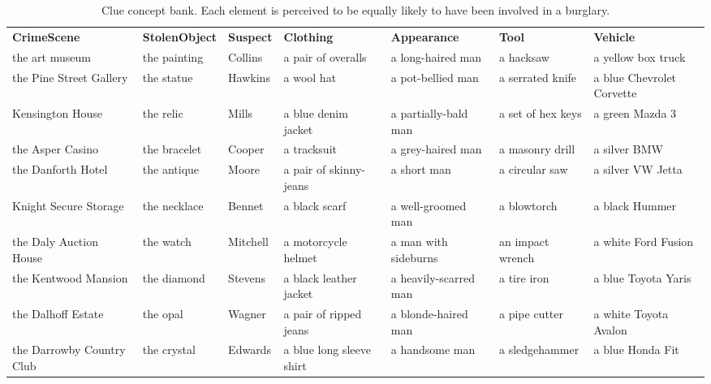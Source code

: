 \documentclass{article}
\begin{document}
\begin{landscape}

\begin{table}[]
\caption {Clue concept bank. Each element is perceived to be equally likely to have been involved in a burglary.} \label{tab:elements} 
\begin{tabular}{lllllll}
\textbf{CrimeScene}       & \textbf{StolenObject} & \textbf{Suspect} & \textbf{Clothing}        & \textbf{Appearance}   & \textbf{Tool}     & \textbf{Vehicle}          \\
the art museum            & the painting          & Collins          & a pair of overalls       & a long-haired man     & a hacksaw         & a yellow box truck        \\
the Pine Street Gallery   & the statue            & Hawkins          & a wool hat               & a pot-bellied man     & a serrated knife  & a blue Chevrolet Corvette \\
Kensington House          & the relic             & Mills            & a blue denim jacket      & a partially-bald man  & a set of hex keys & a green Mazda 3           \\
the Asper Casino          & the bracelet          & Cooper           & a tracksuit              & a grey-haired man     & a masonry drill   & a silver BMW              \\
the Danforth Hotel        & the antique           & Moore            & a pair of skinny-jeans   & a short man           & a circular saw    & a silver VW Jetta         \\
Knight Secure Storage     & the necklace          & Bennet           & a black scarf            & a well-groomed man    & a blowtorch       & a black Hummer            \\
the Daly Auction House    & the watch             & Mitchell         & a motorcycle helmet      & a man with sideburns  & an impact wrench  & a white Ford Fusion       \\
the Kentwood Mansion      & the diamond           & Stevens          & a black leather jacket   & a heavily-scarred man & a tire iron       & a blue Toyota Yaris       \\
the Dalhoff Estate        & the opal              & Wagner           & a pair of ripped jeans   & a blonde-haired man   & a pipe cutter     & a white Toyota Avalon     \\
the Darrowby Country Club & the crystal           & Edwards          & a blue long sleeve shirt & a handsome man        & a sledgehammer    & a blue Honda Fit          \\

\end{tabular}
\end{table}
\end{landscape}
\end{document}
